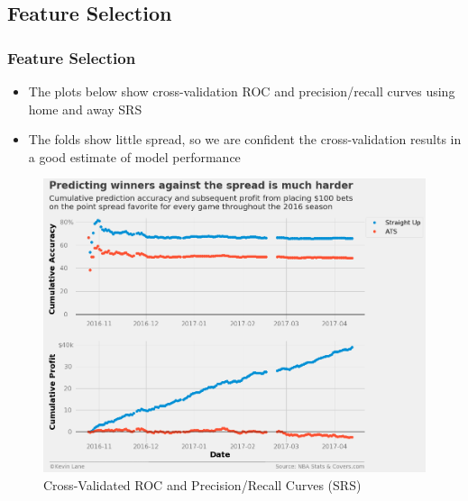 \documentclass{beamer}
\begin{document}
\subsection{Feature Selection}
\begin{frame}
\frametitle{Feature Selection}
\begin{itemize}
    \item The plots below show cross-validation ROC and precision/recall curves using home and away SRS
    \item The folds show little spread, so we are confident the cross-validation results in a good estimate of model performance
\end{itemize}
\begin{figure}
\includegraphics[scale=0.35]{../docs/assets/images/feature-selection/favorite-ats-profit.png}
\caption{Cross-Validated ROC and Precision/Recall Curves (SRS)}
\end{figure}
\end{frame}
\end{document}
